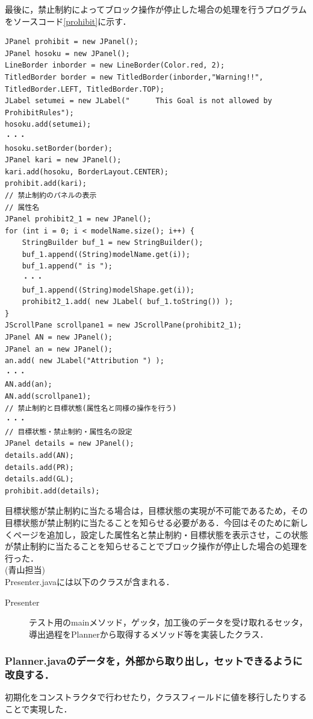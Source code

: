 \documentclass[uplatex,12pt]{jsarticle}
\begin{document}
最後に，禁止制約によってブロック操作が停止した場合の処理を行うプログラムをソースコード\ref{prohibit}に示す．
\begin{lstlisting}[caption=ブロックの状態を表すプログラム,label=prohibit]
JPanel prohibit = new JPanel();
JPanel hosoku = new JPanel();
LineBorder inborder = new LineBorder(Color.red, 2);
TitledBorder border = new TitledBorder(inborder,"Warning!!", TitledBorder.LEFT, TitledBorder.TOP);
JLabel setumei = new JLabel("      This Goal is not allowed by ProhibitRules");
hosoku.add(setumei);
・・・
hosoku.setBorder(border);
JPanel kari = new JPanel();
kari.add(hosoku, BorderLayout.CENTER);
prohibit.add(kari);
// 禁止制約のパネルの表示
// 属性名
JPanel prohibit2_1 = new JPanel();
for (int i = 0; i < modelName.size(); i++) {
	StringBuilder buf_1 = new StringBuilder();
	buf_1.append((String)modelName.get(i));
	buf_1.append(" is ");
	・・・
	buf_1.append((String)modelShape.get(i));
	prohibit2_1.add( new JLabel( buf_1.toString()) );
}
JScrollPane scrollpane1 = new JScrollPane(prohibit2_1);
JPanel AN = new JPanel();
JPanel an = new JPanel();
an.add( new JLabel("Attribution ") );
・・・
AN.add(an);
AN.add(scrollpane1);
// 禁止制約と目標状態(属性名と同様の操作を行う)
・・・
// 目標状態・禁止制約・属性名の設定
JPanel details = new JPanel();
details.add(AN);
details.add(PR);
details.add(GL);
prohibit.add(details);
\end{lstlisting}
目標状態が禁止制約に当たる場合は，目標状態の実現が不可能であるため，その目標状態が禁止制約に当たることを知らせる必要がある．今回はそのために新しくページを追加し，設定した属性名と禁止制約・目標状態を表示させ，この状態が禁止制約に当たることを知らせることでブロック操作が停止した場合の処理を行った．\\

\noindent (青山担当) \\
Presenter.javaには以下のクラスが含まれる．
\begin{description}
\item[Presenter] テスト用のmainメソッド，ゲッタ，加工後のデータを受け取れるセッタ，導出過程をPlannerから取得するメソッド等を実装したクラス．
\end{description}

\subsubsection{Planner.javaのデータを，外部から取り出し，セットできるように改良する．}
初期化をコンストラクタで行わせたり，クラスフィールドに値を移行したりすることで実現した．
\end{document}
